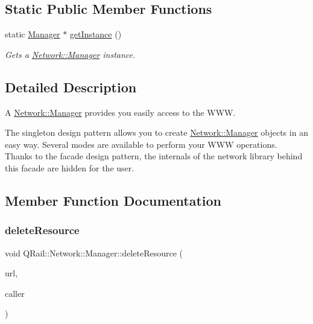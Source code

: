 \subsection*{Static Public Member Functions}
\begin{DoxyCompactItemize}
\item 
static \mbox{\hyperlink{classQRail_1_1Network_1_1Manager}{Manager}} $\ast$ \mbox{\hyperlink{classQRail_1_1Network_1_1Manager_a908536cf83d489afd0480a492f004def}{get\+Instance}} ()
\begin{DoxyCompactList}\small\item\em Gets a \mbox{\hyperlink{classQRail_1_1Network_1_1Manager}{Network\+::\+Manager}} instance. \end{DoxyCompactList}\end{DoxyCompactItemize}


\subsection{Detailed Description}
A \mbox{\hyperlink{classQRail_1_1Network_1_1Manager}{Network\+::\+Manager}} provides you easily access to the W\+WW. 

The singleton design pattern allows you to create \mbox{\hyperlink{classQRail_1_1Network_1_1Manager}{Network\+::\+Manager}} objects in an easy way. Several modes are available to perform your W\+WW operations.~\newline
 Thanks to the facade design pattern, the internals of the network library behind this facade are hidden for the user. 

\subsection{Member Function Documentation}
\mbox{\label{classQRail_1_1Network_1_1Manager_a67ba7523afcb7f97842bb6626a81166d}} 
\subsubsection{\texorpdfstring{deleteResource}{deleteResource}}
{\footnotesize\ttfamily void Q\+Rail\+::\+Network\+::\+Manager\+::delete\+Resource (\begin{DoxyParamCaption}\item[{const Q\+Url \&}]{url,  }\item[{Q\+Object $\ast$}]{caller }\end{DoxyParamCaption})\hspace{0.3cm}{\ttfamily [slot]}}



